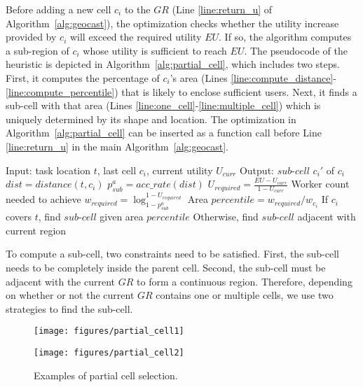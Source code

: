 \documentclass{USC-Thesis}
\renewcommand{\sc}{\textsc}
\numberwithin{equation}{chapter}
\begin{document}
Before adding a new cell $c_i$ to the $\mathit{GR}$ (Line \ref{line:return_u} of Algorithm~\ref{alg:geocast}), the optimization checks whether the utility increase provided by $c_i$ will exceed the required utility $\mathit{EU}$. If so, the algorithm computes a sub-region of $c_i$ whose utility is sufficient to reach $\mathit{EU}$. The pseudocode of the heuristic is depicted in Algorithm~\ref{alg:partial_cell}, which includes two steps. First, it computes the percentage of $c_i$'s area (Lines \ref{line:compute_distance}-\ref{line:compute_percentile}) that is likely to enclose sufficient users. Next, it finds a sub-cell with that area (Lines \ref{line:one_cell}-\ref{line:multiple_cell}) which is uniquely determined by its shape and location. The optimization in Algorithm~\ref{alg:partial_cell} can be inserted as a function call before Line \ref{line:return_u} in the main Algorithm~\ref{alg:geocast}.

\begin{algorithm} [ht]
\caption{\sc Partial Cell Selection Heuristic}
\small
\begin{algorithmic}[1]
\STATE Input: task location $t$, last cell $c_i$, current utility $U_{curr}$\label{line:input_partial_cell}
\STATE Output: $sub$-$cell$ $c_i'$ of $c_i$
\STATE $dist=distance(t,c_i)$ \label{line:compute_distance}
\STATE $p^a_{sub}=acc\_rate(dist)$
\STATE $U_{required} = \frac{EU-U_{curr}}{1-U_{curr}} $ \label{line:u_need}
\STATE Worker count needed to achieve $w_{required}=\log_{1-p^a_{sub}}^{1-U_{required}}$ \label{line:w_need}
\STATE Area $percentile = w_{required}/w_{c_i}$ \label{line:compute_percentile}
\STATE If $c_i$ covers $t$, find $sub$-$cell$ given area $percentile$ \label{line:one_cell}
\STATE Otherwise, find $sub$-$cell$ adjacent with current region \label{line:multiple_cell}
\end{algorithmic}
\label{alg:partial_cell}
\end{algorithm}

To compute a sub-cell, two constraints need to be satisfied. First, the sub-cell needs to be completely inside the parent cell. Second, the sub-cell must be adjacent with the current $\mathit{GR}$ to form a continuous region. Therefore, depending on whether or not the current $\mathit{GR}$ contains one or multiple cells, we use two strategies to find the sub-cell. 

\begin{figure}[tbh]
	\begin{minipage}[b]{.45\linewidth}
	\centering
		\texttt{[image: figures/partial\_cell1]}
		\label{fig:partial_cell1}
	\end{minipage}
	\hspace{8pt}
	\begin{minipage}[b]{.45\linewidth}
	\centering
		\texttt{[image: figures/partial\_cell2]}
		\label{fig:partial_cell2}
	\end{minipage}
	\caption{Examples of partial cell selection.}
\label{fig:examples}
\end{figure}
\end{document}
